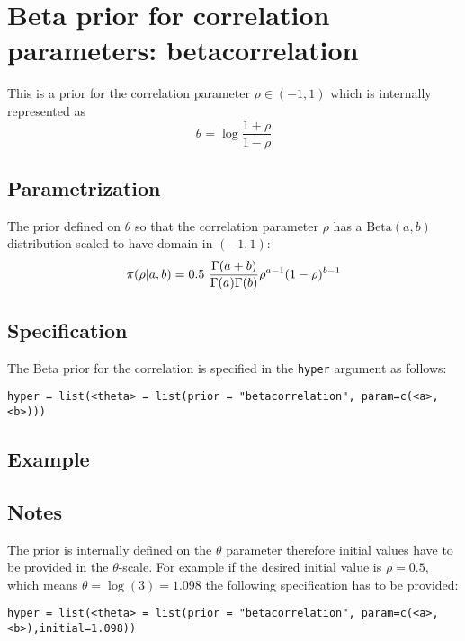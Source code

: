 \documentclass[a4paper,11pt]{article}
\begin{document}
\section*{Beta prior for correlation parameters: betacorrelation}

This is a prior for the correlation parameter $\rho\in(-1,1)$ which is
internally represented as
\[
\theta = \log\frac{1+\rho}{1-\rho}
\]

\subsection*{Parametrization}

The prior defined on $\theta$ so that the correlation parameter $\rho$
has a $\text{Beta}(a,b)$ distribution scaled to have domain in
$(-1,1)$:
\[
\pi(\rho|a,b) = 0.5\ {\Gamma(a+b) \over \Gamma(a) \Gamma(b)}
\rho^{a-1} (1-\rho)^{b-1} 
\]  


\subsection*{Specification}
The Beta prior for the correlation is specified in the {\tt hyper}
argument as follows:
\begin{center}
    {\tt hyper = list(<theta> = list(prior = "betacorrelation", param=c(<a>,<b>)))}
\end{center}

\subsection*{Example}

\subsection*{Notes}

The prior is internally defined on the $\theta$ parameter therefore
initial values have to be provided in the $\theta$-scale. For example
if the desired initial value is $\rho=0.5$, which means
$\theta=\log(3)=1.098$ the following specification has to be
provided:
\begin{center}
    {\tt hyper = list(<theta> = list(prior = "betacorrelation", param=c(<a>,<b>),initial=1.098))}
\end{center}
\end{document}
